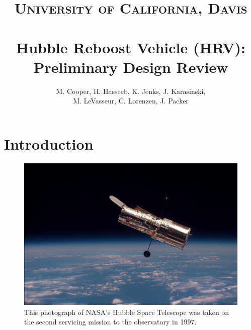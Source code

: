 \documentclass[paper=letter, fontsize=11pt]{scrartcl} %
\title{
\normalfont \normalsize
\textsc{University of California, Davis} \\ [25pt] %
\horrule{2pt} \\[0.4cm] %
\huge Hubble Reboost Vehicle (HRV): \\ Preliminary Design Review %
\horrule{2pt} \\[0.5cm] %
}
\author{
M. Cooper, H. Hasseeb, K. Jenks, J. Karasinski, \\M. LeVasseur, C. Lorenzen, J. Packer} %
\date{} %
\numberwithin{equation}{section} %
\numberwithin{figure}{section} %
\numberwithin{table}{section} %
\begin{document}
\maketitle %
\newpage


\tableofcontents
\newpage



\section{Introduction}

\begin{figure}[tbh]
\begin{center}
\includegraphics[width=1\textwidth]{imgs/hst.jpg}
\caption{This photograph of NASA's Hubble Space Telescope was taken on the second servicing mission to the observatory in 1997.}
\end{center}
\end{figure}
\end{document}
